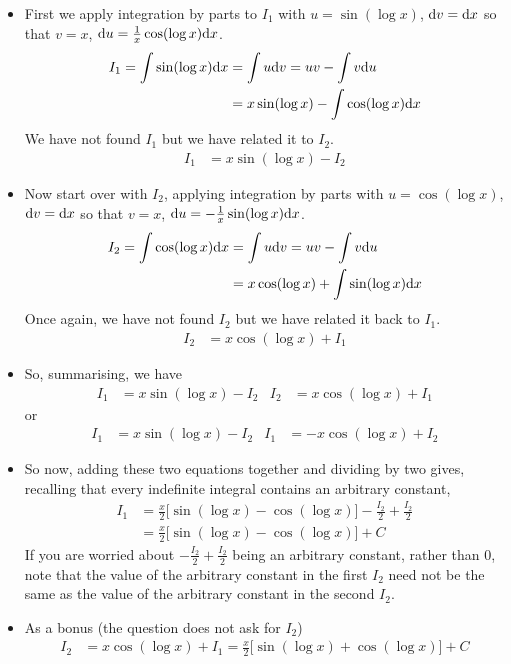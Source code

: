 \begin{solution}
\begin{description}
\begin{itemize}
 \item First we apply integration by parts to $I_1$ with $u=\sin(\log x)$, $\mathrm{d}v = \mathrm{d}x$ so
              that $v = x$, $\mathrm{d}u= \frac{1}{x}\cos(\log x)\mathrm{d}x$.
\begin{align*}
I_1=\int \sin(\log x)\mathrm{d}x
&=\int u \mathrm{d}v = uv -\int v \mathrm{d}u \\
&=x\sin(\log x) - \int \cos(\log x)\mathrm{d}x
\end{align*}
We have not found $I_1$ but we have related it to $I_2$.
\begin{align*}
I_1&= x\sin(\log x) - I_2
\end{align*}
\item Now start over with $I_2$, applying integration by parts with $u=\cos(\log x)$, $\mathrm{d}v = \mathrm{d}x$ so
              that $v = x$, $\mathrm{d}u= -\frac{1}{x}\sin(\log x)\mathrm{d}x$.
\begin{align*}
I_2=\int \cos(\log x)\mathrm{d}x
&=\int u \mathrm{d}v = uv -\int v \mathrm{d}u \\
&=x\cos(\log x) + \int \sin(\log x)\mathrm{d}x
\end{align*}
Once again, we have not found $I_2$ but we have related it back to $I_1$.
\begin{align*}
I_2&=x\cos(\log x) + I_1
\end{align*}
\item So, summarising, we have
\begin{align*}
I_1&= x\sin(\log x) - I_2
& I_2&=x\cos(\log x) + I_1
\end{align*}
or 
\begin{align*}
I_1&= x\sin(\log x) - I_2
& I_1&=-x\cos(\log x) + I_2
\end{align*}
\item So now, adding these two equations together and dividing by two gives,
recalling that every indefinite integral contains an arbitrary constant,
\begin{align*}
I_1&=\frac{x}{2}\big[\sin(\log x)- \cos(\log x)\big] -\frac{I_2}{2}+\frac{I_2}{2} \\
&=\frac{x}{2}\big[\sin(\log x)- \cos(\log x)\big] +C
\end{align*}
If you are worried about $-\frac{I_2}{2}+\frac{I_2}{2}$ being an arbitrary constant, rather than $0$,
note that the value of the arbitrary constant in the first $I_2$ need not be the same as the value 
of the arbitrary constant in the second $I_2$. 

\item
As a bonus (the question does not ask for $I_2$)
\begin{align*}
I_2 &= x\cos(\log x) + I_1 = \frac{x}{2}\big[\sin(\log x)+ \cos(\log x)\big] +C
\end{align*}
\end{itemize}


\end{description}
\end{solution}
